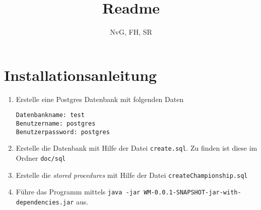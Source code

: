 \documentclass[11pt,german]{scrartcl}
\title{Readme}
\author{NvG, FH, SR}
\date{}
\begin{document}
\renewcommand{\labelenumi}{\alph{enumi})}
\renewcommand{\labelenumii}{$\bullet$}





\maketitle


\section*{Installationsanleitung}
\begin{enumerate}
\item Erstelle eine Postgres Datenbank mit folgenden Daten
\begin{verbatim}Datenbankname: test
Benutzername: postgres
Benutzerpassword: postgres\end{verbatim}

\item Erstelle die Datenbank mit Hilfe der Datei {\tt create.sql}. Zu finden ist diese im Ordner {\tt doc/sql}

\item Erstelle die {\it stored procedures} mit Hilfe der Datei {\tt createChampionship.sql}

\item Führe das Programm mittels {\tt java -jar WM-0.0.1-SNAPSHOT-jar-with-dependencies.jar} aus.
\end{enumerate}
\end{document}
